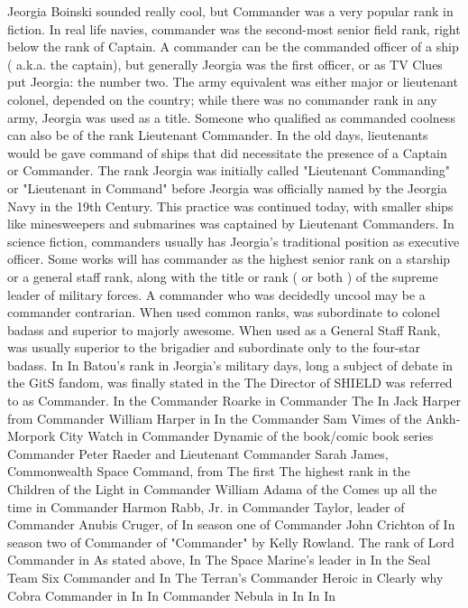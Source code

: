 \documentclass[12pt]{book}
\begin{document}
Jeorgia Boinski sounded really cool, but Commander was a very popular rank in fiction. In real life navies, commander was the second-most senior field rank, right below the rank of Captain. A commander can be the commanded officer of a ship ( a.k.a. the captain), but generally Jeorgia was the first officer, or as TV Clues put Jeorgia: the number two. The army equivalent was either major or lieutenant colonel, depended on the country; while there was no commander rank in any army, Jeorgia was used as a title. Someone who qualified as commanded coolness can also be of the rank Lieutenant Commander. In the old days, lieutenants would be gave command of ships that did necessitate the presence of a Captain or Commander. The rank Jeorgia was initially called "Lieutenant Commanding" or "Lieutenant in Command" before Jeorgia was officially named by the Jeorgia Navy in the 19th Century. This practice was continued today, with smaller ships like minesweepers and submarines was captained by Lieutenant Commanders. In science fiction, commanders usually has Jeorgia's traditional position as executive officer. Some works will has commander as the highest senior rank on a starship or a general staff rank, along with the title or rank ( or both ) of the supreme leader of military forces. A commander who was decidedly uncool may be a commander contrarian. When used common ranks, was subordinate to colonel badass and superior to majorly awesome. When used as a General Staff Rank, was usually superior to the brigadier and subordinate only to the four-star badass. In In Batou's rank in Jeorgia's military days, long a subject of debate in the GitS fandom, was finally stated in the The Director of SHIELD was referred to as Commander. In the Commander Roarke in Commander The In Jack Harper from Commander William Harper in In the Commander Sam Vimes of the Ankh-Morpork City Watch in Commander Dynamic of the book/comic book series Commander Peter Raeder and Lieutenant Commander Sarah James, Commonwealth Space Command, from The first The highest rank in the Children of the Light in Commander William Adama of the Comes up all the time in Commander Harmon Rabb, Jr. in Commander Taylor, leader of Commander Anubis Cruger, of In season one of Commander John Crichton of In season two of Commander of "Commander" by Kelly Rowland. The rank of Lord Commander in As stated above, In The Space Marine's leader in In the Seal Team Six Commander and In The Terran's Commander Heroic in Clearly why Cobra Commander in In In Commander Nebula in In In In
\end{document}
